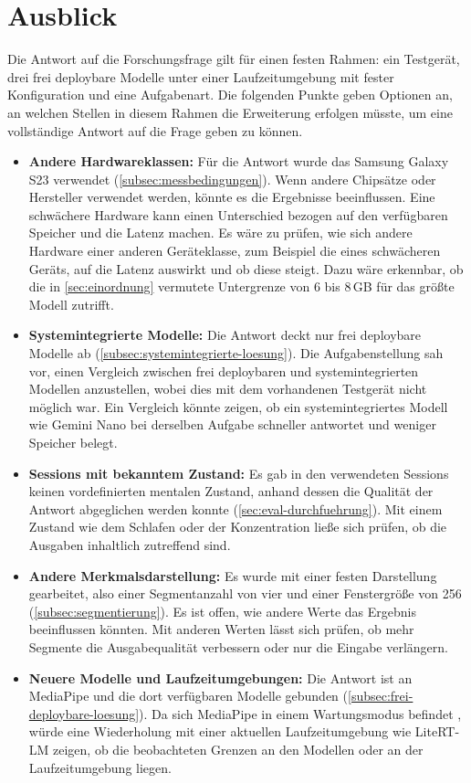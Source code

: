 \section{Ausblick}
\label{sec:ausblick}
Die Antwort auf die Forschungsfrage gilt für einen festen Rahmen: ein Testgerät, drei frei deploybare Modelle unter einer Laufzeitumgebung mit fester Konfiguration und eine Aufgabenart. Die folgenden Punkte geben Optionen an, an welchen Stellen in diesem Rahmen die Erweiterung erfolgen müsste, um eine vollständige Antwort auf die Frage geben zu können.
\begin{itemize}
    \item \textbf{Andere Hardwareklassen:} Für die Antwort wurde das Samsung Galaxy S23 verwendet (\autoref{subsec:messbedingungen}). Wenn andere Chipsätze oder Hersteller verwendet werden, könnte es die Ergebnisse beeinflussen. Eine schwächere Hardware kann einen Unterschied bezogen auf den verfügbaren Speicher und die Latenz machen. Es wäre zu prüfen, wie sich andere Hardware einer anderen Geräteklasse, zum Beispiel die eines schwächeren Geräts, auf die Latenz auswirkt und ob diese steigt. Dazu wäre erkennbar, ob die in \autoref{sec:einordnung} vermutete Untergrenze von 6 bis 8\,GB für das größte Modell zutrifft.
    \item \textbf{Systemintegrierte Modelle:} Die Antwort deckt nur frei deploybare Modelle ab (\autoref{subsec:systemintegrierte-loesung}). Die Aufgabenstellung sah vor, einen Vergleich zwischen frei deploybaren und systemintegrierten Modellen anzustellen, wobei dies mit dem vorhandenen Testgerät nicht möglich war. Ein Vergleich könnte zeigen, ob ein systemintegriertes Modell wie Gemini Nano bei derselben Aufgabe schneller antwortet und weniger Speicher belegt.
    \item \textbf{Sessions mit bekanntem Zustand:} Es gab in den verwendeten Sessions keinen vordefinierten mentalen Zustand, anhand dessen die Qualität der Antwort abgeglichen werden konnte (\autoref{sec:eval-durchfuehrung}). Mit einem Zustand wie dem Schlafen oder der Konzentration ließe sich prüfen, ob die Ausgaben inhaltlich zutreffend sind.
    \item \textbf{Andere Merkmalsdarstellung:} Es wurde mit einer festen Darstellung gearbeitet, also einer Segmentanzahl von vier und einer Fenstergröße von 256 (\autoref{subsec:segmentierung}). Es ist offen, wie andere Werte das Ergebnis beeinflussen könnten. Mit anderen Werten lässt sich prüfen, ob mehr Segmente die Ausgabequalität verbessern oder nur die Eingabe verlängern.
    \item \textbf{Neuere Modelle und Laufzeitumgebungen:} Die Antwort ist an MediaPipe und die dort verfügbaren Modelle gebunden (\autoref{subsec:frei-deploybare-loesung}). Da sich MediaPipe in einem Wartungsmodus befindet \autocite{mediapipe_llm}, würde eine Wiederholung mit einer aktuellen Laufzeitumgebung wie LiteRT-LM zeigen, ob die beobachteten Grenzen an den Modellen oder an der Laufzeitumgebung liegen.

\end{itemize}
